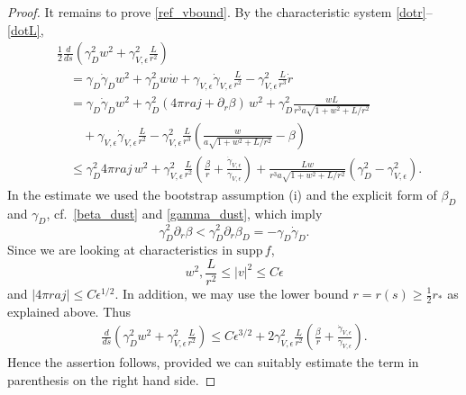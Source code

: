 \documentclass[10pt,a4paper]{amsart}
\def\supp{\mathrm{supp}\,}
\begin{document}
\begin{proof}
  It remains to prove \eqref{ref_vbound}.
  By the characteristic system \eqref{dotr}--\eqref{dotL},
  \begin{align*}
    &
    \frac{1}{2}\frac{d}{ds}\left(\gamma_D^2 w^2
    + \gamma^2_{V,\epsilon} \frac{L}{r^2}\right)\\
    &
    \quad = \gamma_D \dot\gamma_D w^2 + \gamma_D^2 w \dot w
    + \gamma_{V,\epsilon} \dot\gamma_{V,\epsilon} \frac{L}{r^2}
    - \gamma^2_{V,\epsilon} \frac{L}{r^3}\dot r \\
    &
    \quad = \gamma_D \dot\gamma_D w^2 +
    \gamma_D^2 (4\pi r a j + \partial_r\beta)\,w^2
    + \gamma_D^2 \frac{w L}{r^3 a \sqrt{1+w^2 +L/r^2}}\\
    &\qquad
    {}+ \gamma_{V,\epsilon} \dot\gamma_{V,\epsilon} \frac{L}{r^2}
    - \gamma^2_{V,\epsilon} \frac{L}{r^3}
    \left(\frac{w}{a \sqrt{1+w^2 +L/r^2}} - \beta\right)  \\
    &
    \quad \leq \gamma_D^2 4\pi r a j \,w^2  + \gamma^2_{V,\epsilon}\frac{L}{r^2}
    \left(\frac{\beta}{r}+\frac{\dot\gamma_{V,\epsilon}}{\gamma_{V,\epsilon}}\right)
    +\frac{L w}{r^3 a \sqrt{1+w^2 +L/r^2}}(\gamma_D^2- \gamma^2_{V,\epsilon}). 
  \end{align*}
  In the estimate we used the bootstrap assumption (i) and
  the explicit form of $\beta_D$ and $\gamma_D$,
  cf.~\eqref{beta_dust} and \eqref{gamma_dust}, which imply
  \[
  \gamma_D^2\partial_r\beta < \gamma_D^2\partial_r\beta_D =
  - \gamma_D \dot\gamma_D .
  \]
  Since we are looking at characteristics in $\supp f$,
  \[
  w^2, \frac{L}{r^2}\leq |v|^2 \leq C \epsilon
  \]
  and $|4\pi r a j|\leq C \epsilon^{1/2}$. In addition, we may use the lower
  bound $r=r(s)\geq \frac{1}{2}r_\ast$ as explained above.
  Thus
  \begin{align}\label{wLest}
  \frac{d}{ds}\left(\gamma_D^2 w^2 + \gamma^2_{V,\epsilon} \frac{L}{r^2}\right)
  \leq C \epsilon^{3/2} + 2\gamma^2_{V,\epsilon}\frac{L}{r^2}
  \left(\frac{\beta}{r}+\frac{\dot\gamma_{V,\epsilon}}{\gamma_{V,\epsilon}}\right).
  \end{align}
  Hence the assertion follows, provided we can suitably estimate the term
  in parenthesis on the right hand side.


\end{proof}
\end{document}
